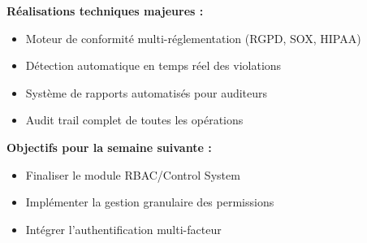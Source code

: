 \textbf{Réalisations techniques majeures :}
\begin{itemize}
    \item Moteur de conformité multi-réglementation (RGPD, SOX, HIPAA)
    \item Détection automatique en temps réel des violations
    \item Système de rapports automatisés pour auditeurs
    \item Audit trail complet de toutes les opérations
\end{itemize}

\textbf{Objectifs pour la semaine suivante :}
\begin{itemize}
    \item Finaliser le module RBAC/Control System
    \item Implémenter la gestion granulaire des permissions
    \item Intégrer l'authentification multi-facteur
\end{itemize}